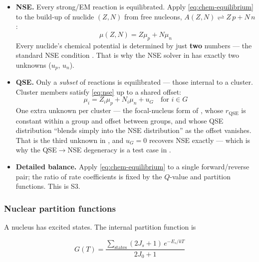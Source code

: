 \begin{itemize}
\item \textbf{NSE.} Every strong/EM reaction is equilibrated. Apply
      \eqref{eq:chem-equilibrium} to the build-up of nuclide $(Z,N)$ from free
      nucleons, $A(Z,N) \rightleftharpoons Z\,p + N\,n$:
      \begin{equation}
      \mu(Z,N) = Z\mu_p + N\mu_n
      \label{eq:nse}
      \end{equation}
      Every nuclide's chemical potential is determined by just \textbf{two}
      numbers --- the standard NSE condition
      \citep{hix1996,hix1999b,pitrou2018}. That is why the NSE solver in
       has exactly two unknowns ($u_p$, $u_n$).

\item \textbf{QSE.} Only a \emph{subset} of reactions is equilibrated --- those
      internal to a cluster. Cluster members satisfy \eqref{eq:nse} up to a
      shared offset:
      \begin{equation}
      \mu_i = Z_i\mu_p + N_i\mu_n + u_G \quad \text{for } i\in G
      \label{eq:qse-offset}
      \end{equation}
      One extra unknown per cluster --- the focal-nucleus form of
      \citet{hix1996}, whose $r_{\mathrm{QSE}}$ is constant within a group and
      offset between groups, and whose QSE distribution ``blends simply into
      the NSE distribution'' as the offset vanishes. That is the third unknown
      in , and $u_G = 0$ recovers NSE exactly --- which is why
      the QSE$\to$NSE degeneracy is a test case in
      .

\item \textbf{Detailed balance.} Apply \eqref{eq:chem-equilibrium} to a single
      forward/reverse pair; the ratio of rate coefficients is fixed by the
      $Q$-value and partition functions. This is S3.
\end{itemize}

\subsubsection{Nuclear partition functions}
\label{sec:partitionfunctions}

A nucleus has excited states. The internal partition function is

\begin{equation}
G(T) = \frac{\sum_{\text{states}} (2J_s+1)\,e^{-E_s/kT}}{2J_0+1}
\label{eq:partition-fn}
\end{equation}

